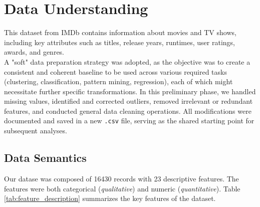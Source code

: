 \documentclass[10pt]{article}
\begin{document}
\section{Data Understanding}
This dataset from IMDb contains information about movies and TV shows, including key attributes such as titles, release years, runtimes, user ratings, awards, and genres.
\\A "soft" data preparation strategy was adopted, as the objective was to create a consistent and coherent baseline to be used across various required tasks (clustering, classification, pattern mining, regression), each of which might necessitate further specific transformations. In this preliminary phase, we handled missing values, identified and corrected outliers, removed irrelevant or redundant features, and conducted general data cleaning operations. All modifications were documented and saved in a new \texttt{.csv} file, serving as the shared starting point for subsequent analyses.\subsection{Data Semantics}
Our datase was composed of 16430 records with 23 descriptive features. The features were both categorical (\textit{qualitative}) and numeric (\textit{quantitative}). Table \ref{tab:feature_description} summarizes the key features of the dataset.
\setlength{\tabcolsep}{6pt} %
\renewcommand{\arraystretch}{1.3} %
\end{document}
